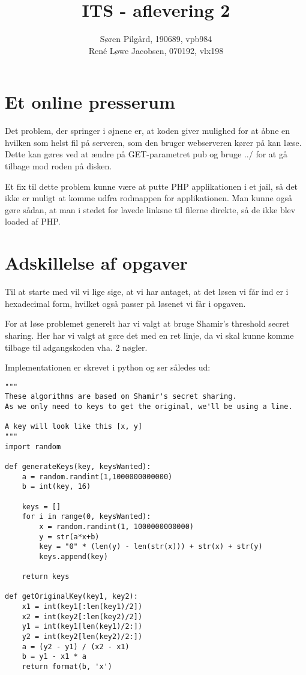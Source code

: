 \documentclass[10pt,a4paper,danish]{article}
\title{ITS - aflevering 2}
\author{Søren Pilgård, 190689, vpb984\\
  René Løwe Jacobsen, 070192, vlx198}
\begin{document}
\maketitle
\newpage

\tableofcontents
\newpage

\section{Et online presserum}
Det problem, der springer i øjnene er, at koden giver mulighed for at åbne en
hvilken som helst fil på serveren, som den bruger webserveren kører på kan læse.
Dette kan gøres ved at ændre på GET-parametret pub og bruge ../ for at gå tilbage
mod roden på disken.

Et fix til dette problem kunne være at putte PHP applikationen i et jail, så det
ikke er muligt at komme udfra rodmappen for applikationen.
Man kunne også gøre sådan, at man i stedet for lavede linksne til filerne
direkte, så de ikke blev loaded af PHP.

\section{Adskillelse af opgaver}
Til at starte med vil vi lige sige, at vi har antaget, at det løsen vi får
ind er i hexadecimal form, hvilket også passer på løsenet vi får i opgaven.

For at løse problemet generelt har vi valgt at bruge Shamir's threshold secret
sharing. Her har vi valgt at gøre det med en ret linje, da vi skal kunne komme
tilbage til adgangskoden vha. 2 nøgler.

Implementationen er skrevet i python og ser således ud:
\begin{verbatim}
"""
These algorithms are based on Shamir's secret sharing.
As we only need to keys to get the original, we'll be using a line.

A key will look like this [x, y]
"""
import random

def generateKeys(key, keysWanted):
    a = random.randint(1,1000000000000)
    b = int(key, 16)

    keys = []
    for i in range(0, keysWanted):
        x = random.randint(1, 1000000000000)
        y = str(a*x+b)
        key = "0" * (len(y) - len(str(x))) + str(x) + str(y)
        keys.append(key)

    return keys

def getOriginalKey(key1, key2):
    x1 = int(key1[:len(key1)/2])
    x2 = int(key2[:len(key2)/2])
    y1 = int(key1[len(key1)/2:])
    y2 = int(key2[len(key2)/2:])
    a = (y2 - y1) / (x2 - x1)
    b = y1 - x1 * a
    return format(b, 'x')
\end{verbatim}
\end{document}
